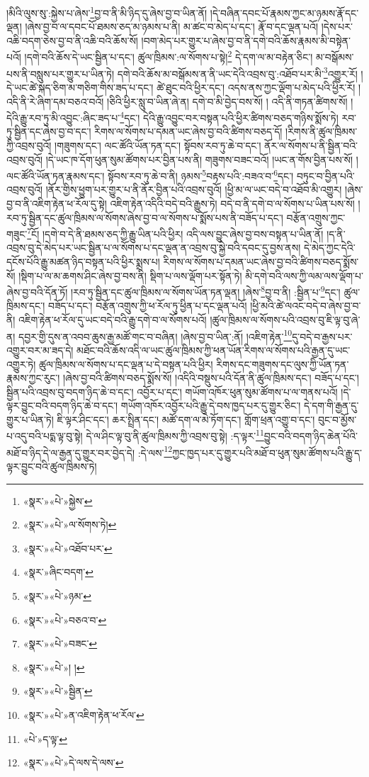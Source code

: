 །མིའི་ལུས་སུ་:སྐྱེས་པ་ཞེས་\footnote{«སྣར་»«པེ་»སྐྱེས་}བྱ་བ་ནི་མི་ཉིད་དུ་ཞེས་བྱ་བ་ཡིན་ནོ། །དེ་བཞིན་དབང་པོ་རྣམས་ཀྱང་མ་ཉམས་རྣོ་དང་ལྡན། །ཞེས་བྱ་བ་ལ་དབང་པོ་ཐམས་ཅད་མ་ཉམས་པ་ནི། མ་ཚང་བ་མེད་པ་དང་། རྣོ་བ་དང་ལྡན་པའོ། །དེས་པར་འཆི་བདག་ཅེས་བྱ་བ་ནི་འཆི་བའི་ཆོས་སོ། །བག་མེད་པར་གྱུར་པ་ཞེས་བྱ་བ་ནི་དགེ་བའི་ཆོས་རྣམས་མི་བསྟེན་པའོ། །དགེ་བའི་ཆོས་དེ་ཡང་སྦྱིན་པ་དང་། ཚུལ་ཁྲིམས་:ལ་སོགས་པ་སྟེ།\footnote{«སྣར་»«པེ་»ལ་སོགས་ཏེ།} དེ་དག་ལ་མ་བརྟེན་ཅིང་། མ་བསྒོམས་པས་ནི་བསླུས་པར་གྱུར་པ་ཡིན་ཏེ། དགེ་བའི་ཆོས་མ་བསྒོམས་ན་ནི་ཡང་དེའི་འབྲས་བུ་:འཐོབ་པར་མི་\footnote{«སྣར་»«པེ་»འཐོབ་པར་}འགྱུར་རོ། །དེ་ཡང་ཚེ་སྐད་ཅིག་མ་གཅིག་གིས་ཟད་པ་དང་། ཚེ་ཐུང་བའི་ཕྱིར་དང་། འདས་ནས་ཀྱང་ལྡོག་པ་མེད་པའི་ཕྱིར་རོ། །འདི་ནི་རེ་ཞིག་དམ་བཅའ་བའོ། །ཅིའི་ཕྱིར་སླུ་བ་ཡིན་ཞེ་ན། དགེ་བ་མི་བྱེད་བས་སོ། །
འདི་ནི་གཏན་ཚིགས་སོ། །དེའི་རྒྱུ་རབ་ཏུ་མི་འབྱུང་:ཞིང་ཟད་པ་\footnote{«སྣར་»ཞིང་བདག་}དང་། དེའི་རྒྱུ་འབྱུང་བར་བསྟན་པའི་ཕྱིར་ཚིགས་བཅད་གཉིས་སྨོས་ཏེ། རབ་ཏུ་སྦྱིན་དང་ཞེས་བྱ་བ་དང་། རིགས་ལ་སོགས་པ་དམན་ཡང་ཞེས་བྱ་བའི་ཚིགས་བཅད་དོ། །རིགས་ནི་ཚུལ་ཁྲིམས་ཀྱི་འབྲས་བུའོ། །གཟུགས་དང་། ལང་ཚོའི་ཡོན་ཏན་དང་། སྟོབས་རབ་ཏུ་ཆེ་བ་དང་། ནོར་ལ་སོགས་པ་ནི་སྦྱིན་བའི་འབྲས་བུའོ། །དེ་ཡང་ཁ་དོག་ཕུན་སུམ་ཚོགས་པར་བྱིན་པས་ནི། གཟུགས་བཟང་བའོ། །ཡང་ན་གོས་བྱིན་པས་སོ། །ལང་ཚོའི་ཡོན་ཏན་རྣམས་དང་། སྟོབས་རབ་ཏུ་ཆེ་བ་ནི། ཉམས་\footnote{«སྣར་»«པེ་»ཉམ་}བརྟས་པའི་:བཟའ་བ་\footnote{«སྣར་»«པེ་»བཅའ་བ་}དང་། བཏུང་བ་བྱིན་པའི་འབྲས་བུའོ། །ནོར་གྱིས་ཕྱུག་པར་གྱུར་པ་ནི་ནོར་བྱིན་པའི་འབྲས་བུའོ། །ཕྱི་མ་ལ་ཡང་བདེ་བ་འཐོབ་མི་འགྱུར། །ཞེས་བྱ་བ་ནི་འཇིག་རྟེན་ཕ་རོལ་དུ་སྟེ། འཇིག་རྟེན་འདིའི་བདེ་བའི་རྒྱུས་ཏེ། བདེ་བ་ནི་དགེ་བ་ལ་སོགས་པ་ཡིན་པས་སོ། །རབ་ཏུ་སྦྱིན་དང་ཚུལ་ཁྲིམས་ལ་སོགས་ཞེས་བྱ་བ་ལ་སོགས་པ་སྨོས་པས་ནི་བཟོད་པ་དང་། བརྩོན་འགྲུས་ཀྱང་གཟུང་\footnote{«སྣར་»«པེ་»བཟང་}ངོ། །དགེ་བ་དེ་ནི་ཐམས་ཅད་ཀྱི་རྒྱུ་ཡིན་པའི་ཕྱིར། འདི་ལས་བྱུང་ཞེས་བྱ་བས་བསྟན་པ་ཡིན་ནོ། །ད་ནི་འབྲས་བུ་དེ་མེད་པར་ཡང་སྦྱིན་པ་ལ་སོགས་པ་དང་ལྡན་ན་འབྲས་བུ་སྐྱེ་བའི་དབང་དུ་བྱས་ནས། དེ་མེད་ཀྱང་དེའི་དངོས་པོའི་རྒྱུ་མཚན་ཉིད་བསྟན་པའི་ཕྱིར་སྨྲས་པ། རིགས་ལ་སོགས་པ་དམན་ཡང་ཞེས་བྱ་བའི་ཚིགས་བཅད་སྨོས་སོ། །སྡིག་པ་ལ་མ་ཆགས་ཤིང་ཞེས་བྱ་བས་ནི། སྡིག་པ་ལས་ལྡོག་པར་སྟོན་ཏེ། མི་དགེ་བའི་ལས་ཀྱི་ལམ་ལས་ལྡོག་པ་ཞེས་བྱ་བའི་དོན་ཏོ། །རབ་ཏུ་སྦྱིན་དང་ཚུལ་ཁྲིམས་ལ་སོགས་ཡོན་ཏན་ལྡན། །ཞེས་\footnote{«སྣར་»«པེ་»། །}བྱ་བ་ནི། :སྦྱིན་པ་\footnote{«སྣར་»«པེ་»སྦྱིན་}དང་། ཚུལ་ཁྲིམས་དང་། བཟོད་པ་དང་། བརྩོན་འགྲུས་ཀྱི་ཕ་རོལ་ཏུ་ཕྱིན་པ་དང་ལྡན་པའོ། །ཕྱི་མའི་ཚེ་ལའང་བདེ་བ་ཞེས་བྱ་བ་ནི། འཇིག་རྟེན་ཕ་རོལ་དུ་ཡང་བདེ་བའི་རྒྱུ་དགེ་བ་ལ་སོགས་པའོ། །ཚུལ་ཁྲིམས་ལ་སོགས་པའི་འབྲས་བུ་ཇི་ལྟ་བུ་ཞེ་ན། དབྱར་གྱི་དུས་ན་འབབ་ཆུས་རྒྱ་མཚོ་གང་བ་བཞིན། །ཞེས་བྱ་བ་ཡིན་:ནོ། །འཇིག་རྟེན་\footnote{«སྣར་»«པེ་»ན་འཇིག་རྟེན་ཕ་རོལ་}དུ་བདེ་བ་རྒྱས་པར་འགྱུར་བར་མ་ཟད་དེ། མཐོང་བའི་ཆོས་འདི་ལ་ཡང་ཚུལ་ཁྲིམས་ཀྱི་ཕན་ཡོན་རིགས་ལ་སོགས་པའི་རྒྱན་དུ་ཡང་འགྱུར་ཏེ། ཚུལ་ཁྲིམས་ལ་སོགས་པ་དང་ལྡན་པ་དེ་བསྟན་པའི་ཕྱིར། རིགས་དང་གཟུགས་དང་ལུས་ཀྱི་ཡོན་ཏན་རྣམས་ཀྱང་རུང་། །ཞེས་བྱ་བའི་ཚིགས་བཅད་སྨོས་སོ། །འདིའི་བསྡུས་པའི་དོན་ནི་ཚུལ་ཁྲིམས་དང་། བཟོད་པ་དང་། སྦྱིན་པའི་འབྲས་བུ་བདག་ཉིད་ཆེ་བ་དང་། འབྱོར་པ་དང་། གཡོག་འཁོར་ཕུན་སུམ་ཚོགས་པ་ལ་གནས་པའོ། །དེ་ལྟར་བྱུང་བའི་བདག་ཉིད་ཆེ་བ་དང་། གཡོག་འཁོར་འབྱོར་པའི་རྒྱུ་དེ་བས་ཁྱད་པར་དུ་གྱུར་ཅིང་། དེ་དག་གི་རྒྱན་དུ་གྱུར་པ་ཡིན་ཏེ། ཇི་ལྟར་ཤིང་དང་། ཆར་སྤྲིན་དང་། མཚོ་དག་ལ་མེ་ཏོག་དང་། གློག་ཕྲན་འགྱུ་བ་དང་། བུང་བ་མྱོས་པ་འདུ་བའི་པདྨ་ལྟ་བུ་སྟེ། དེ་ལ་ཤིང་ལྟ་བུ་ནི་ཚུལ་ཁྲིམས་ཀྱི་འབྲས་བུ་སྟེ། :ད་ལྟར་\footnote{«པེ་»ད་ལྟ་}བྱུང་བའི་བདག་ཉིད་ཆེན་པོའི་མཐོ་བ་ཉིད་དེ་ལ་རྒྱན་དུ་གྱུར་བར་བྱེད་དེ། :དེ་ལས་\footnote{«སྣར་»«པེ་»དེ་ལས་དེ་ལས་}ཀྱང་ཁྱད་པར་དུ་གྱུར་པའི་མཐོ་བ་ཕུན་སུམ་ཚོགས་པའི་རྒྱུ་ད་ལྟར་བྱུང་བའི་ཚུལ་ཁྲིམས་ཏེ། 